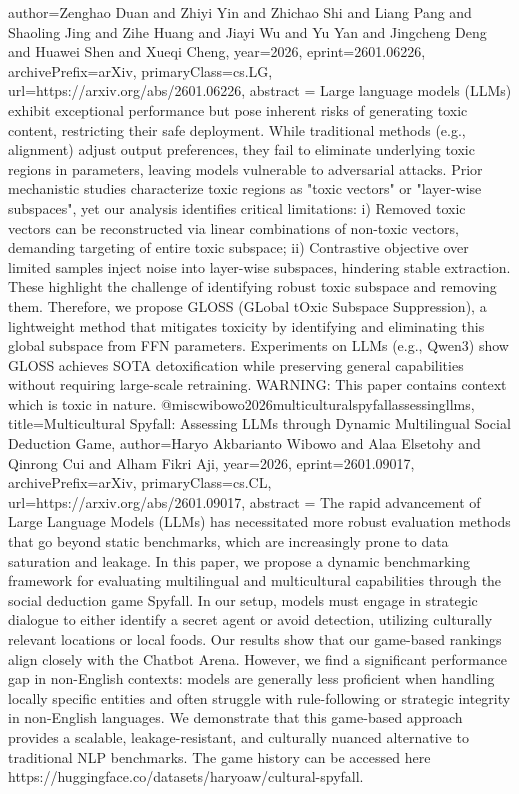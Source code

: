 {      author={Zenghao Duan and Zhiyi Yin and Zhichao Shi and Liang Pang and Shaoling Jing and Zihe Huang and Jiayi Wu and Yu Yan and Jingcheng Deng and Huawei Shen and Xueqi Cheng},
      year={2026},
      eprint={2601.06226},
      archivePrefix={arXiv},
      primaryClass={cs.LG},
      url={https://arxiv.org/abs/2601.06226},
      abstract = {Large language models (LLMs) exhibit exceptional performance but pose inherent risks of generating toxic content, restricting their safe deployment. While traditional methods (e.g., alignment) adjust output preferences, they fail to eliminate underlying toxic regions in parameters, leaving models vulnerable to adversarial attacks. Prior mechanistic studies characterize toxic regions as "toxic vectors" or "layer-wise subspaces", yet our analysis identifies critical limitations: i) Removed toxic vectors can be reconstructed via linear combinations of non-toxic vectors, demanding targeting of entire toxic subspace; ii) Contrastive objective over limited samples inject noise into layer-wise subspaces, hindering stable extraction. These highlight the challenge of identifying robust toxic subspace and removing them. Therefore, we propose GLOSS (GLobal tOxic Subspace Suppression), a lightweight method that mitigates toxicity by identifying and eliminating this global subspace from FFN parameters. Experiments on LLMs (e.g., Qwen3) show GLOSS achieves SOTA detoxification while preserving general capabilities without requiring large-scale retraining. WARNING: This paper contains context which is toxic in nature.}
}@misc{wibowo2026multiculturalspyfallassessingllms,
      title={Multicultural Spyfall: Assessing LLMs through Dynamic Multilingual Social Deduction Game}, 
      author={Haryo Akbarianto Wibowo and Alaa Elsetohy and Qinrong Cui and Alham Fikri Aji},
      year={2026},
      eprint={2601.09017},
      archivePrefix={arXiv},
      primaryClass={cs.CL},
      url={https://arxiv.org/abs/2601.09017},
      abstract = {The rapid advancement of Large Language Models (LLMs) has necessitated more robust evaluation methods that go beyond static benchmarks, which are increasingly prone to data saturation and leakage. In this paper, we propose a dynamic benchmarking framework for evaluating multilingual and multicultural capabilities through the social deduction game Spyfall. In our setup, models must engage in strategic dialogue to either identify a secret agent or avoid detection, utilizing culturally relevant locations or local foods. Our results show that our game-based rankings align closely with the Chatbot Arena. However, we find a significant performance gap in non-English contexts: models are generally less proficient when handling locally specific entities and often struggle with rule-following or strategic integrity in non-English languages. We demonstrate that this game-based approach provides a scalable, leakage-resistant, and culturally nuanced alternative to traditional NLP benchmarks. The game history can be accessed here https://huggingface.co/datasets/haryoaw/cultural-spyfall.}
}
